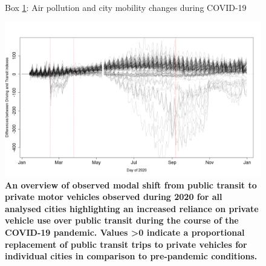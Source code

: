 \documentclass[preprint,10pt]{elsarticle} %
\begin{document}
{\begin{figure}
{{}}
\captionsetup{labelformat=empty}
\caption{Box \ref{box:pollution}: Air pollution and city mobility changes during COVID-19}\label{box:pollution}
\end{figure}

\begin{figure}
\centering
\includegraphics[trim={0 0 0 0},clip,scale=0.4]{Images2/DrivingMinusTransit.png}
\caption{\bf An overview of observed modal shift from public transit to private motor vehicles observed during 2020 for all analysed cities highlighting an increased reliance on private vehicle use over public transit during the course of the COVID-19 pandemic. Values \textgreater 0 indicate a proportional replacement of public transit trips to private vehicles for individual cities in comparison to pre-pandemic conditions.}  
 \label{fig:driv_trans}
\end{figure}


}
\end{document}
